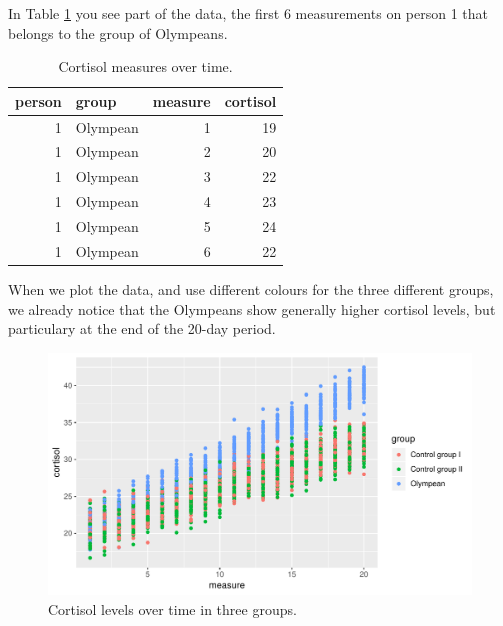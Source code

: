 \documentclass[]{report}\usepackage[]{graphicx}\usepackage[]{color}
\makeatletter
\def\maxwidth{ %
  \ifdim\Gin@nat@width>\linewidth
    \linewidth
  \else
    \Gin@nat@width
  \fi
}
\newenvironment{knitrout}{}{} %
\makeatother
\begin{document}
In Table \ref{tab:analysismixed20_1} you see part of the data, the first 6 measurements on person 1 that belongs to the group of Olympeans.

\begin{table}[ht]
\centering
\caption{Cortisol measures over time.} 
\label{tab:analysismixed20_1}
\begin{tabular}{rlrr}
  \hline
person & group & measure & cortisol \\ 
  \hline
1 & Olympean & 1 & 19 \\ 
  1 & Olympean & 2 & 20 \\ 
  1 & Olympean & 3 & 22 \\ 
  1 & Olympean & 4 & 23 \\ 
  1 & Olympean & 5 & 24 \\ 
  1 & Olympean & 6 & 22 \\ 
   \hline
\end{tabular}
\end{table}


When we plot the data, and use different colours for the three different groups, we already notice that the Olympeans show generally higher cortisol levels, but particulary at the end of the 20-day period.



\begin{knitrout}
\color{fgcolor}\begin{figure}

{\centering \includegraphics[width=\maxwidth]{figure/analysismixed20_2-1} 

}

\caption[Cortisol levels over time in three groups]{Cortisol levels over time in three groups.}\label{fig:analysismixed20_2}
\end{figure}


\end{knitrout}
\end{document}
